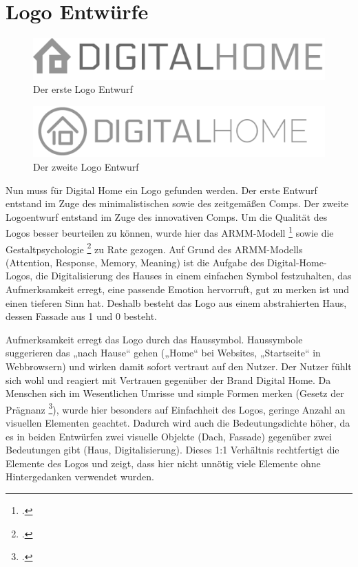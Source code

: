 \section{Logo Entwürfe}
\begin{figure} [tp]
\includegraphics[width=\textwidth]{./img/logo1.png}
\caption{Der erste Logo Entwurf}
\label{logo1}
\end{figure}
\begin{figure} [tp]
\includegraphics[width=\textwidth]{./img/logo2.png}
\caption{Der zweite Logo Entwurf}
\label{logo2}
\end{figure}
Nun muss für Digital Home ein Logo gefunden werden. Der erste Entwurf entstand im Zuge des minimalistischen sowie des zeitgemäßen Comps. Der zweite Logoentwurf entstand im Zuge des innovativen Comps. Um die Qualität des Logos besser beurteilen zu können, wurde hier das ARMM-Modell \footcite[vgl.][]{ARMM:model} sowie die Gestaltpsychologie \footcite[vgl.][]{gestalt} zu Rate gezogen. Auf Grund des ARMM-Modells (Attention, Response, Memory, Meaning) ist die Aufgabe des Digital-Home-Logos, die Digitalisierung des Hauses in einem einfachen Symbol festzuhalten, das Aufmerksamkeit erregt, eine passende Emotion hervorruft, gut zu merken ist und einen tieferen Sinn hat. Deshalb besteht das Logo aus einem abstrahierten Haus, dessen Fassade aus 1 und 0 besteht.

Aufmerksamkeit erregt das Logo durch das Haussymbol. Haussymbole suggerieren das „nach Hause“ gehen („Home“ bei Websites, „Startseite“ in Webbrowsern) und wirken damit sofort vertraut auf den Nutzer. Der Nutzer fühlt sich wohl und reagiert mit Vertrauen gegenüber der Brand Digital Home. Da Menschen sich im Wesentlichen Umrisse und simple Formen merken (Gesetz der Prägnanz \footcite[vgl.][]{gestalt}), wurde hier besonders auf Einfachheit des Logos, geringe Anzahl an visuellen Elementen geachtet. Dadurch wird auch die Bedeutungsdichte höher, da es in beiden Entwürfen zwei visuelle Objekte (Dach, Fassade) gegenüber zwei Bedeutungen gibt (Haus, Digitalisierung). Dieses 1:1 Verhältnis rechtfertigt die Elemente des Logos und zeigt, dass hier nicht unnötig viele Elemente ohne Hintergedanken verwendet wurden.

